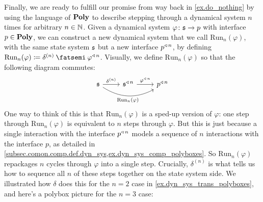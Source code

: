 \documentclass[Book-Poly]{subfiles}
\begin{document}
Finally, we are ready to fulfill our promise from way back in \cref{ex.do_nothing} by using the language of $\mathbf{Poly}$ to describe stepping through a dynamical system $n$ times for arbitrary $n\in\mathbb{N}$.
Given a dynamical system $\varphi\colon\mathfrak{s}\to p$ with interface $p\in\mathbf{Poly}$, we can construct a new dynamical system that we call $\text{Run}_n(\varphi)$, with the same state system $\mathfrak{s}$ but a new interface $p^{\mathbin{\triangleleft}\,n}$, by defining $\text{Run}_n(\varphi)\coloneqq\delta^{(n)}\then\varphi\tripow{n}$.
Visually, we define $\text{Run}_n(\varphi)$ so that the following diagram commutes:
\begin{equation*}%
\begin{tikzcd}
	\car{s}\ar[r, "\delta^{(n)}"]\ar[rr, bend right, "{\text{Run}_n(\varphi)}"']&
	\car{s}\tripow{n}\ar[r, "\varphi\tripow{n}"]&
	p\tripow n
\end{tikzcd}
\end{equation*}
One way to think of this is that $\text{Run}_n(\varphi)$ is a sped-up version of $\varphi$: one step through $\text{Run}_n(\varphi)$ is equivalent to $n$ steps through $\varphi$.
But this is just because a single interaction with the interface $p^{\mathbin{\triangleleft}\,n}$ models a sequence of $n$ interactions with the interface $p$, as detailed in \cref{subsec.comon.comp.def.dyn_sys,ex.dyn_sys_comp_polyboxes}.
So $\text{Run}_n(\varphi)$ repackages $n$ cycles through $\varphi$ into a single step.
Crucially, $\delta^{(n)}$ is what tells us how to sequence all $n$ of these steps together on the state system side.
We illustrated how $\delta$ does this for the $n=2$ case in \cref{ex.dyn_sys_trans_polyboxes}, and here's a polybox picture for the $n=3$ case:
\end{document}
